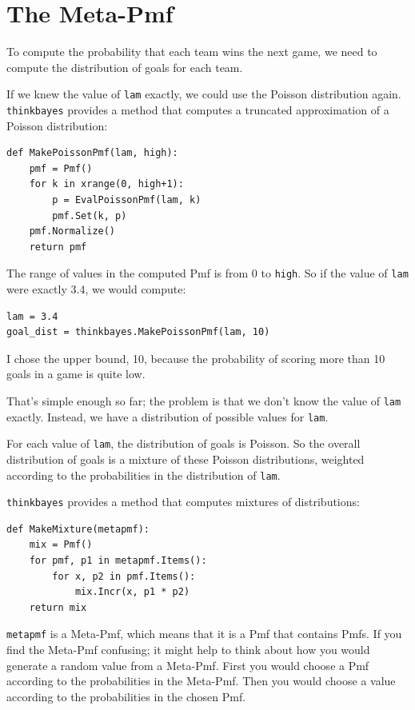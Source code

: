 \documentclass[12pt]{book}
\begin{document}
\section{The Meta-Pmf}
\label{meta-pmf}

To compute the probability that each team wins the next game,
we need to compute the distribution of goals for each team.

If we knew the value of {\tt lam} exactly, we could use the
Poisson distribution again.  \verb"thinkbayes" provides a
method that computes a truncated approximation of a Poisson
distribution:

\begin{verbatim}
def MakePoissonPmf(lam, high):
    pmf = Pmf()
    for k in xrange(0, high+1):
        p = EvalPoissonPmf(lam, k)
        pmf.Set(k, p)
    pmf.Normalize()
    return pmf
\end{verbatim}  

The range of values in the computed Pmf is from 0 to {\tt high}.
So if the value of {\tt lam} were exactly 3.4, we would compute:

\begin{verbatim}
lam = 3.4
goal_dist = thinkbayes.MakePoissonPmf(lam, 10)
\end{verbatim}

I chose the upper bound, 10, because the probability of scoring
more than 10 goals in a game is quite low.

That's simple enough so far; the problem is that we don't know
the value of {\tt lam} exactly.  Instead, we have a distribution
of possible values for {\tt lam}.

For each value of {\tt lam}, the distribution of goals is Poisson.
So the overall distribution of goals is a mixture of these
Poisson distributions, weighted according to the probabilities
in the distribution of {\tt lam}.

\verb"thinkbayes" provides a method that computes mixtures
of distributions:

\begin{verbatim}
def MakeMixture(metapmf):
    mix = Pmf()
    for pmf, p1 in metapmf.Items():
        for x, p2 in pmf.Items():
            mix.Incr(x, p1 * p2)
    return mix
\end{verbatim}  

{\tt metapmf} is a Meta-Pmf, which means that it is a Pmf that
contains Pmfs.  If you find the Meta-Pmf confusing; it might
help to think about how you would generate a random value from
a Meta-Pmf.  First you would choose a Pmf according to the
probabilities in the Meta-Pmf.  Then you would choose a value
according to the probabilities in the chosen Pmf.
\end{document}
